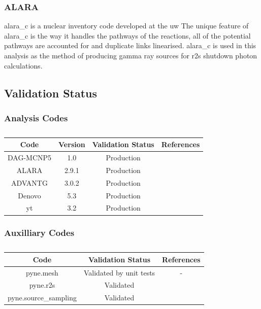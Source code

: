 \documentclass[12pt]{article}
\begin{document}
\subsubsection{ALARA}
\gls{alara_c} \cite{alara} is a nuclear inventory code developed at the \gls{uw}
The unique feature of \gls{alara_c} is the way it handles the
pathways of the reactions, all of the potential pathways are accounted for and
duplicate links linearised. \gls{alara_c} is used in this analysis as the method
of producing gamma ray sources for \gls{r2s} shutdown photon calculations.
\subsection{Validation Status}
\subsubsection*{Analysis Codes}
\begin{centering}
 \begin{table}[ht!]
  \begin{tabular}{c | c | c | c}
  \hline
  Code & Version & Validation Status & References \\
  \hline 
  DAG-MCNP5 & 1.0 & Production & \cite{dagmc_validation}\\
  ALARA & 2.9.1 & Production & \cite{alara}\\
  ADVANTG & 3.0.2 & Production & \cite{advantg}\\
  Denovo & 5.3 & Production & \cite{denovo} \\
  yt & 3.2 & Production & \\
  \end{tabular}
 \caption{}
 \label{table:validation}
 \end{table}
\end{centering}
\subsubsection*{Auxilliary Codes}
\begin{centering}
 \begin{table}[ht!]
  \begin{tabular}{c | c | c}
  \hline
  Code & Validation Status & References \\    
  \hline
  pyne.mesh & Validated by unit tests & - \\
  pyne.r2s & Validated & \cite{pyne_r2s} \\
  pyne.source\_sampling & Validated & \cite{pyne_r2s} \\
 \end{tabular}
 \caption{}
 \label{table:validation_aux}
 \end{table}
\end{centering}
\newpage
\end{document}
